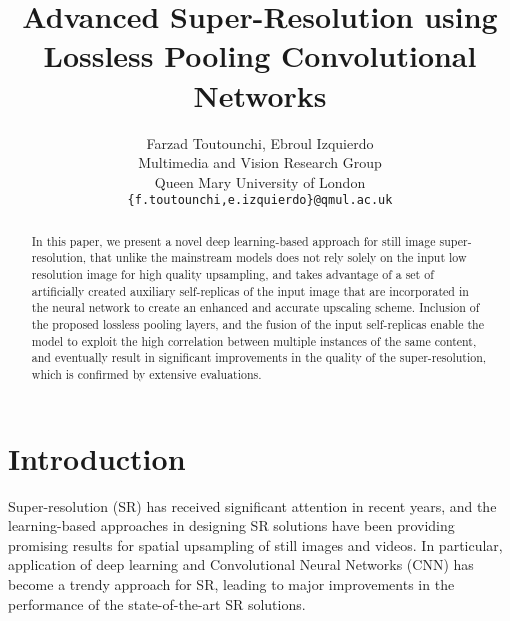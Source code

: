 \documentclass[10pt,twocolumn,letterpaper]{article}
\begin{document}
\title{Advanced Super-Resolution using Lossless Pooling Convolutional Networks}

\author{Farzad Toutounchi, Ebroul Izquierdo \\
Multimedia and Vision Research Group\\Queen Mary University of London\\
{\tt\small \{f.toutounchi,e.izquierdo\}@qmul.ac.uk}
}

\maketitle
\ifwacvfinal\thispagestyle{empty}\fi

\begin{abstract}
In this paper, we present a novel deep learning-based approach for still image
super-resolution, that unlike the mainstream models does not rely solely on the 
input low resolution image for high quality upsampling, and takes advantage
of a set of artificially created auxiliary self-replicas of the input image that
are incorporated in the neural network to create an enhanced and accurate 
upscaling scheme. Inclusion of the proposed lossless pooling layers, and the fusion
of the input self-replicas enable the model to exploit the high correlation
between multiple instances of the same content, and eventually result in significant
improvements in the quality of the super-resolution, which is confirmed
by extensive evaluations.

\end{abstract}

\section{Introduction}
\label{sec:intro}
Super-resolution (SR) has received significant attention in recent years, and the learning-based
approaches in designing SR solutions have been providing promising results for spatial
upsampling of still images and videos. In particular, application of deep learning and 
Convolutional Neural Networks (CNN) has become a trendy approach for SR, leading to
major improvements in the performance of the state-of-the-art SR solutions.
\end{document}
